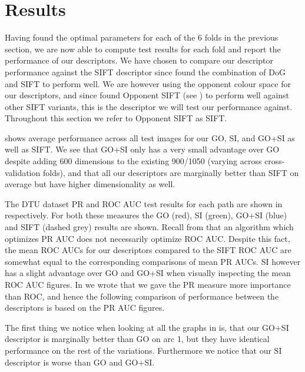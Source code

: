 \documentclass[thesis.tex]{subfiles}
\begin{document}
\section{Results}
\label{sec:icResults}
%
Having found the optimal parameters for each of the 6 folds in the previous section, we are now able to compute test results for each fold and report the performance of our descriptors.
We have chosen to compare our descriptor performance against the SIFT descriptor since \citet{dahl2011finding} found the combination of DoG and SIFT to perform well. We are however using the opponent colour space for our descriptors, and since \citet{dahl2012interest} found Opponent SIFT (see ) to perform well against other SIFT variants, this is the descriptor we will test our performance against. Throughout this section we refer to Opponent SIFT as SIFT.

 shows average performance across all test images for our GO, SI, and GO+SI as well as SIFT. We see that GO+SI only has a very small advantage over GO despite adding 600 dimensions to the existing 900/1050 (varying across cross-validation folds), and that all our descriptors are marginally better than SIFT on average but have higher dimensionality as well.

The DTU dataset PR and ROC AUC test results for each path are shown in  respectively. For both these measures the GO (red), SI (green), GO+SI (blue) and SIFT (dashed grey) results are shown. Recall from  that an algorithm which optimizes PR AUC does not necessarily optimize ROC AUC. Despite this fact, the mean ROC AUCs for our descriptors compared to the SIFT ROC AUC are somewhat equal to the corresponding comparisons of mean PR AUCs. SI however has a slight advantage over GO and GO+SI when visually inspecting the mean ROC AUC figures. In  we wrote that we gave the PR measure more importance than ROC, and hence the following comparison of performance between the descriptors is based on the PR AUC figures.

The first thing we notice when looking at all the graphs in  is, that our GO+SI descriptor is marginally better than GO on arc 1, but they have identical performance on the rest of the variations. Furthermore we notice that our SI descriptor is worse than GO and GO+SI.
\end{document}
